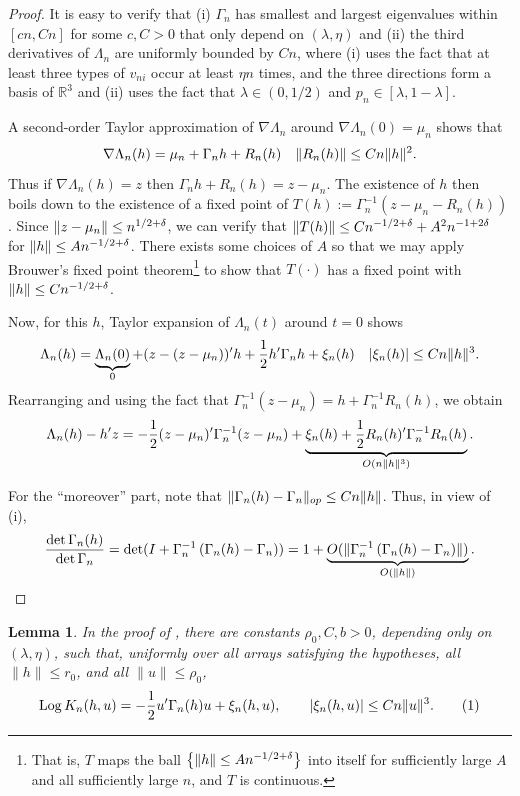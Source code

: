 \documentclass[12pt,reqno]{amsart}
\theoremstyle{theorem}
\newtheorem{lem}{Lemma}[section]
\theoremstyle{definition}
\newcommand\numberthis{\addtocounter{equation}{1}\tag{\theequation}}
\newcommand{\0}{\mathbf{0}}
\newcommand{\1}{\mathbf{1}}
\DeclareMathOperator{\Log}{Log} %
\begin{document}
\begin{proof} It is easy to verify that (i) $\Gamma_n$ has smallest and largest
 eigenvalues within $[cn, Cn]$
 for some $c,C > 0$ that only depend on $(\lambda, \eta)$
 and (ii) the third derivatives of $\Lambda_n$ are uniformly
 bounded by $Cn$, where (i) uses the fact that at least three types of $v_{ni}$ occur at
 least $\eta n$ times, and the three directions form a basis of $\mathbb R^3$ and
 (ii) uses the fact that $\lambda \in (0,1/2)$ and $p_n \in [\lambda, 1-\lambda]$.


A second-order Taylor approximation of $\nabla \Lambda_n$
around $\nabla\Lambda_n
(0) = \mu_n$ shows
that \[
	\nabla \Lambda_n(h) = \mu_n + \Gamma_n h + R_n(h) \quad \lVert R_n(h)\rVert \le Cn
	\lVert h\rVert^2.
\]
Thus if $\nabla \Lambda_n(h) = z$ then $ \Gamma_n h + R_n(h) = z - \mu_n.$ The
 existence of $h$ then boils down to the existence of a fixed point of \( T
 (h) := \Gamma_n^{-1} (z - \mu_n - R_n(h)) \).
 Since $\lVert z- \mu_n\rVert \le n^
 {1/2+\delta}$, we can verify that $\lVert T(h)\rVert \le Cn^{-1/2 + \delta} + A^2 n^
 {-1+2\delta}$ for $\lVert h\rVert \le A n^{-1/2+\delta}$.
 There exists some choices of $A$ so
 that we may apply Brouwer's fixed point theorem\footnote{That is, $T$ maps the ball
 $\left\{{\lVert h\rVert \le A n^{-1/2+\delta}}\right\}$ into itself for sufficiently large $A$ and all
 sufficiently large $n$,
 and $T$ is continuous. } to show that $T (\cdot)$ has a fixed
 point with $\lVert h\rVert \le C n^{-1/2 + \delta}$.

	Now, for this $h$, Taylor expansion of $\Lambda_n(t)$ around $t=0$ shows \[
		\Lambda_n(h) = \underbrace{\Lambda_n(0)}_{0} + (z - (z-\mu_n))'h + \frac12 h'
		\Gamma_n h +
		\xi_n (h) \quad |\xi_n
		(h) |  \le  Cn \lVert h\rVert^3.
	\]
	Rearranging and using the fact that $\Gamma_n^{-1} (z-\mu_n) = h + \Gamma_n^{-1} R_n(h)$,
	we obtain \[
		\Lambda_n(h) - h'z = -\frac{1}{2} (z-\mu_n)'\Gamma_n^{-1} (z-\mu_n) +
		\underbrace{\xi_n (h) +
				\frac{1}{2} R_n(h)' \Gamma_n^{-1} R_n(h)}_{O(n\lVert h\rVert^3)}.
	\]

	For the ``moreover'' part, note that \(
		\lVert\Gamma_n(h) - \Gamma_n\rVert_{op} \le C n \lVert h\rVert
	\).
	Thus, in view of (i), \[
		\frac{\det \Gamma_n(h)}{\det \Gamma_n} = \det(I + \Gamma_n^{-1}\left(\Gamma_n(h) -
		\Gamma_n\right)) = 1 + \underbrace{O(\lVert\Gamma_n^{-1}\left(\Gamma_n(h) -
				\Gamma_n\right)\rVert)}_{O(\lVert h\rVert)}.\qedhere
	\]
\end{proof}

\begin{lem}\label{lem:K-small-frequency}
In the proof of , there are constants \(\rho_0,C,b>0\), depending only on
\((\lambda,\eta)\), such that, uniformly over all arrays satisfying the
hypotheses, all \(\|h\|\le r_0\), and all \(\|u\|\le\rho_0\),
\[\Log K_n(h,u) = -\frac12u'\Gamma_n(h)u+\xi_n(h,u),
\qquad
|\xi_n(h,u)|\le Cn\|u\|^3.
\numberthis \label{eq:logKexpansion}
\]
\end{lem}
\end{document}
